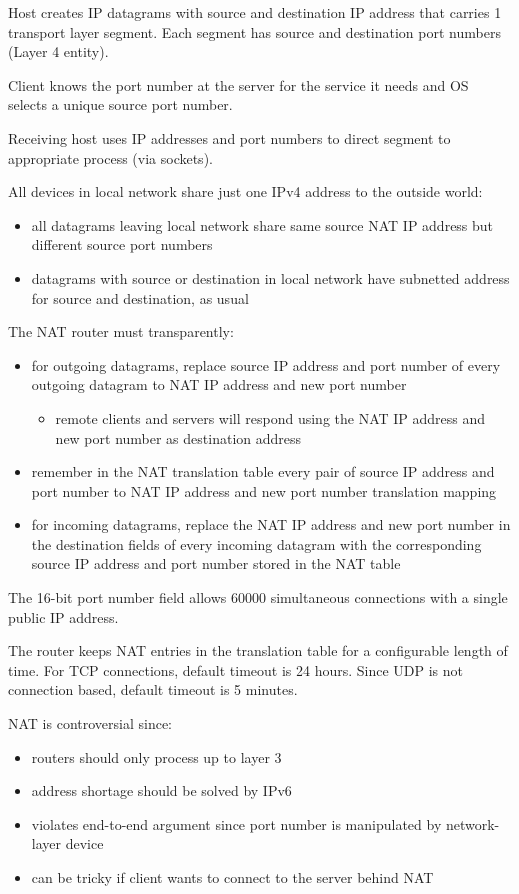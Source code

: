 \documentclass[11pt]{article}
\begin{document}
Host creates IP datagrams with source and destination IP address that carries
1 transport layer segment. Each segment has source and destination port
numbers (Layer 4 entity).

Client knows the port number at the server for the service it needs and OS
selects a unique source port number.

Receiving host uses IP addresses and port numbers to direct segment to appropriate
process (via sockets).

All devices in local network share just one IPv4 address to the outside world:
\begin{itemize}
\item all datagrams leaving local network share same source NAT IP address but
different source port numbers
\item datagrams with source or destination in local network have subnetted address
for source and destination, as usual
\end{itemize}

The NAT router must transparently:
\begin{itemize}
\item for outgoing datagrams, replace source IP address and port number of every
outgoing datagram to NAT IP address and new port number
\begin{itemize}
\item remote clients and servers will respond using the NAT IP address and
new port number as destination address
\end{itemize}
\item remember in the NAT translation table every pair of source IP address and port
number to NAT IP address and new port number translation mapping
\item for incoming datagrams, replace the NAT IP address and new port number in the
destination fields of every incoming datagram with the corresponding
source IP address and port number stored in the NAT table
\end{itemize}

The 16-bit port number field allows 60000 simultaneous connections with a single
public IP address.

The router keeps NAT entries in the translation table for a configurable length
of time.
For TCP connections, default timeout is 24 hours.
Since UDP is not connection based, default timeout is 5 minutes.

NAT is controversial since:
\begin{itemize}
\item routers should only process up to layer 3
\item address shortage should be solved by IPv6
\item violates end-to-end argument since port number is manipulated by
network-layer device
\item can be tricky if client wants to connect to the server behind NAT
\end{itemize}
\end{document}
